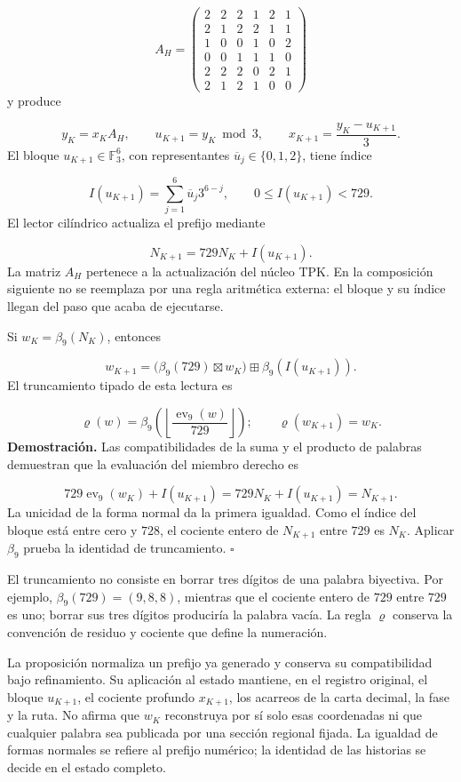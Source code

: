 \[
A_H=
\begin{pmatrix}
2&2&2&1&2&1\\
2&1&2&2&1&1\\
1&0&0&1&0&2\\
0&0&1&1&1&0\\
2&2&2&0&2&1\\
2&1&2&1&0&0
\end{pmatrix}
\]
y produce

\[
y_K=x_KA_H,\qquad
u_{K+1}=y_K\bmod3,\qquad
x_{K+1}=\frac{y_K-u_{K+1}}3.
\]
El bloque \(u_{K+1}\in\mathbb F_3^6\), con representantes \(\overline u_j\in\{0,1,2\}\), tiene índice

\[
I(u_{K+1})=\sum_{j=1}^{6}\overline u_j3^{6-j},
\qquad 0\leq I(u_{K+1})<729.
\]
El lector cilíndrico actualiza el prefijo mediante

\[
N_{K+1}=729N_K+I(u_{K+1}).
\]
La matriz \(A_H\) pertenece a la actualización del núcleo TPK. En la composición siguiente no se reemplaza por una regla aritmética externa: el bloque y su índice llegan del paso que acaba de ejecutarse.

Si \(w_K=\beta_9(N_K)\), entonces

\[
w_{K+1}
=\bigl(\beta_9(729)\boxtimes w_K\bigr)
\boxplus\beta_9(I(u_{K+1})).
\]
El truncamiento tipado de esta lectura es

\[
\varrho(w)=
\beta_9\!\left(
\left\lfloor\frac{\operatorname{ev}_9(w)}{729}\right\rfloor
\right);
\qquad \varrho(w_{K+1})=w_K.
\]
\textbf{Demostración.} Las compatibilidades de la suma y el producto de palabras demuestran que la evaluación del miembro derecho es

\[
729\operatorname{ev}_9(w_K)+I(u_{K+1})
=729N_K+I(u_{K+1})=N_{K+1}.
\]
La unicidad de la forma normal da la primera igualdad. Como el índice del bloque está entre cero y \(728\), el cociente entero de \(N_{K+1}\) entre \(729\) es \(N_K\). Aplicar \(\beta_9\) prueba la identidad de truncamiento. \hfill\(\square\)

El truncamiento no consiste en borrar tres dígitos de una palabra biyectiva. Por ejemplo, \(\beta_9(729)=(9,8,8)\), mientras que el cociente entero de \(729\) entre \(729\) es uno; borrar sus tres dígitos produciría la palabra vacía. La regla \(\varrho\) conserva la convención de residuo y cociente que define la numeración.

La proposición normaliza un prefijo ya generado y conserva su compatibilidad bajo refinamiento. Su aplicación al estado mantiene, en el registro original, el bloque \(u_{K+1}\), el cociente profundo \(x_{K+1}\), los acarreos de la carta decimal, la fase y la ruta. No afirma que \(w_K\) reconstruya por sí solo esas coordenadas ni que cualquier palabra sea publicada por una sección regional fijada. La igualdad de formas normales se refiere al prefijo numérico; la identidad de las historias se decide en el estado completo.

